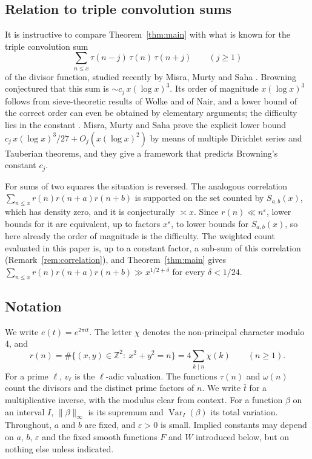 \documentclass[11pt]{amsart}
\theoremstyle{remark}
\theoremstyle{definition}
\numberwithin{equation}{section}
\newcommand{\Z}{\mathbb{Z}}
\newcommand{\eps}{\varepsilon}
\newcommand{\Var}{\operatorname{Var}}
\begin{document}
\subsection{Relation to triple convolution sums}
It is instructive to compare Theorem~\ref{thm:main} with what is known for the triple convolution sum
\[
\sum_{n\le x}\tau(n-j)\,\tau(n)\,\tau(n+j)\qquad(j\ge1)
\]
of the divisor function, studied recently by Misra, Murty and Saha \cite{MMS}. Browning conjectured that this sum is $\sim c_j\,x(\log x)^3$. Its order of magnitude $x(\log x)^3$ follows from sieve-theoretic results of Wolke and of Nair, and a lower bound of the correct order can even be obtained by elementary arguments; the difficulty lies in the constant \cite{MMS}. Misra, Murty and Saha prove the explicit lower bound $c_j\,x(\log x)^3/27+O_j(x(\log x)^2)$ by means of multiple Dirichlet series and Tauberian theorems, and they give a framework that predicts Browning's constant $c_j$.

For sums of two squares the situation is reversed. The analogous correlation $\sum_{n\le x}r(n)r(n+a)r(n+b)$ is supported on the set counted by $S_{a,b}(x)$, which has density zero, and it is conjecturally $\asymp x$. Since $r(n)\ll n^{\eps}$, lower bounds for it are equivalent, up to factors $x^{\eps}$, to lower bounds for $S_{a,b}(x)$, so here already the order of magnitude is the difficulty. The weighted count evaluated in this paper is, up to a constant factor, a sub-sum of this correlation (Remark~\ref{rem:correlation}), and Theorem~\ref{thm:main} gives $\sum_{n\le x}r(n)r(n+a)r(n+b)\gg x^{1/2+\delta}$ for every $\delta<1/24$.

\subsection{Notation}
We write $e(t)=e^{2\pi it}$. The letter $\chi$ denotes the non-principal character modulo $4$, and
\[
r(n)=\#\{(x,y)\in\Z^2:\ x^2+y^2=n\}=4\sum_{k\mid n}\chi(k)\qquad(n\ge1).
\]
For a prime $\ell$, $v_\ell$ is the $\ell$-adic valuation. The functions $\tau(n)$ and $\omega(n)$ count the divisors and the distinct prime factors of $n$. We write $\bar t$ for a multiplicative inverse, with the modulus clear from context. For a function $\beta$ on an interval $I$, $\|\beta\|_\infty$ is its supremum and $\Var_I(\beta)$ its total variation. Throughout, $a$ and $b$ are fixed, and $\eps>0$ is small. Implied constants may depend on $a$, $b$, $\eps$ and the fixed smooth functions $F$ and $W$ introduced below, but on nothing else unless indicated.
\end{document}

